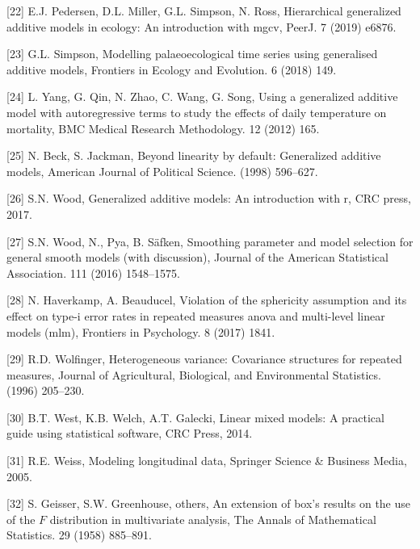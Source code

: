 \documentclass[
]{article}
\begin{document}
\leavevmode\hypertarget{ref-pedersen2019}{}%
{[}22{]} E.J. Pedersen, D.L. Miller, G.L. Simpson, N. Ross, Hierarchical generalized additive models in ecology: An introduction with mgcv, PeerJ. 7 (2019) e6876.

\leavevmode\hypertarget{ref-simpson2018}{}%
{[}23{]} G.L. Simpson, Modelling palaeoecological time series using generalised additive models, Frontiers in Ecology and Evolution. 6 (2018) 149.

\leavevmode\hypertarget{ref-yang2012}{}%
{[}24{]} L. Yang, G. Qin, N. Zhao, C. Wang, G. Song, Using a generalized additive model with autoregressive terms to study the effects of daily temperature on mortality, BMC Medical Research Methodology. 12 (2012) 165.

\leavevmode\hypertarget{ref-beck1998}{}%
{[}25{]} N. Beck, S. Jackman, Beyond linearity by default: Generalized additive models, American Journal of Political Science. (1998) 596--627.

\leavevmode\hypertarget{ref-wood2017}{}%
{[}26{]} S.N. Wood, Generalized additive models: An introduction with r, CRC press, 2017.

\leavevmode\hypertarget{ref-wood2016}{}%
{[}27{]} S.N. Wood, N., Pya, B. Säfken, Smoothing parameter and model selection for general smooth models (with discussion), Journal of the American Statistical Association. 111 (2016) 1548--1575.

\leavevmode\hypertarget{ref-haverkamp2017}{}%
{[}28{]} N. Haverkamp, A. Beauducel, Violation of the sphericity assumption and its effect on type-i error rates in repeated measures anova and multi-level linear models (mlm), Frontiers in Psychology. 8 (2017) 1841.

\leavevmode\hypertarget{ref-wolfinger1996}{}%
{[}29{]} R.D. Wolfinger, Heterogeneous variance: Covariance structures for repeated measures, Journal of Agricultural, Biological, and Environmental Statistics. (1996) 205--230.

\leavevmode\hypertarget{ref-west2014}{}%
{[}30{]} B.T. West, K.B. Welch, A.T. Galecki, Linear mixed models: A practical guide using statistical software, CRC Press, 2014.

\leavevmode\hypertarget{ref-weiss2005}{}%
{[}31{]} R.E. Weiss, Modeling longitudinal data, Springer Science \& Business Media, 2005.

\leavevmode\hypertarget{ref-geisser1958}{}%
{[}32{]} S. Geisser, S.W. Greenhouse, others, An extension of box's results on the use of the \(F\) distribution in multivariate analysis, The Annals of Mathematical Statistics. 29 (1958) 885--891.
\end{document}
